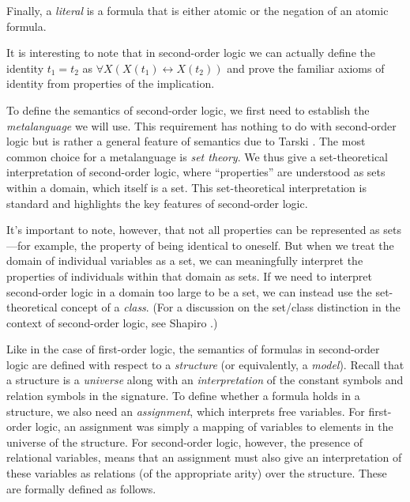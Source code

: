 \documentclass[11pt,twoside=off,numbers=noenddot]{scrbook}
\begin{document}
Finally, a \emph{literal} is a formula that is either atomic or the
negation of an atomic formula.

\begin{remark}
  It is interesting to note that in second-order logic we can
  actually define the identity $t_1 = t_2$ as $\forall X (X(t_1)
  \leftrightarrow X(t_2))$ and prove the familiar axioms of identity
  from properties of the implication.
\end{remark}

To define the semantics of second-order logic, we first need to
establish the \emph{metalanguage} we will use. This requirement has
nothing to do with second-order logic but is rather a general feature
of semantics due to Tarski \cite{tarski1956concept}. The most common
choice for a metalanguage is \emph{set theory}. We thus give a
set-theoretical interpretation of second-order logic, where
``properties'' are understood as sets within a domain, which itself
is a set. This set-theoretical interpretation is standard and
highlights the key features of second-order logic.

\begin{remark}
  It's important to note, however, that not all properties can be
  represented as sets—for example, the property of being identical to
  oneself. But when we treat the domain of individual variables as a
  set, we can meaningfully interpret the properties of individuals
  within that domain as sets. If we need to interpret second-order
  logic in a domain too large to be a set, we can instead use the
  set-theoretical concept of a \emph{class}. (For a discussion on the
    set/class distinction in the context of second-order logic, see
  Shapiro \cite{shapiro1991foundations}.)
\end{remark}

Like in the case of first-order logic, the semantics of formulas in
second-order logic are defined with respect to a \emph{structure} (or
equivalently, a \emph{model}). Recall that a structure is a
\emph{universe} along with an \emph{interpretation} of the constant
symbols and relation symbols in the signature. To define whether a
formula holds in a structure, we also need an \emph{assignment},
which interprets free variables. For first-order logic, an assignment
was simply a mapping of variables to elements in the universe of the
structure. For second-order logic, however, the presence of
relational variables, means that an assignment must also give an
interpretation of these variables as relations (of the appropriate
arity) over the structure. These are formally defined as follows.
\end{document}
